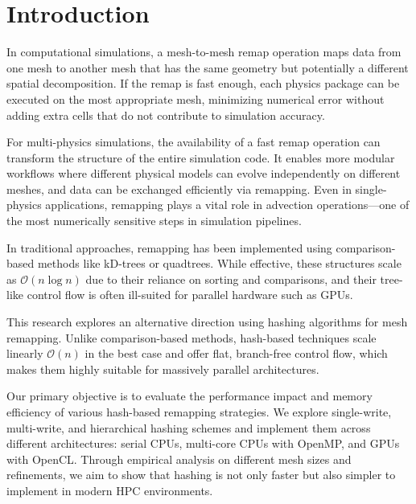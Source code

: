 \section{Introduction}

In computational simulations, a mesh-to-mesh remap operation maps data from one mesh to another mesh that has the same geometry but potentially a different spatial decomposition. If the remap is fast enough, each physics package can be executed on the most appropriate mesh, minimizing numerical error without adding extra cells that do not contribute to simulation accuracy.

For multi-physics simulations, the availability of a fast remap operation can transform the structure of the entire simulation code. It enables more modular workflows where different physical models can evolve independently on different meshes, and data can be exchanged efficiently via remapping. Even in single-physics applications, remapping plays a vital role in advection operations—one of the most numerically sensitive steps in simulation pipelines.

In traditional approaches, remapping has been implemented using comparison-based methods like kD-trees or quadtrees. While effective, these structures scale as $\mathcal{O}(n \log n)$ due to their reliance on sorting and comparisons, and their tree-like control flow is often ill-suited for parallel hardware such as GPUs.

This research explores an alternative direction using hashing algorithms for mesh remapping. Unlike comparison-based methods, hash-based techniques scale linearly $\mathcal{O}(n)$ in the best case and offer flat, branch-free control flow, which makes them highly suitable for massively parallel architectures.

Our primary objective is to evaluate the performance impact and memory efficiency of various hash-based remapping strategies. We explore single-write, multi-write, and hierarchical hashing schemes and implement them across different architectures: serial CPUs, multi-core CPUs with OpenMP, and GPUs with OpenCL. Through empirical analysis on different mesh sizes and refinements, we aim to show that hashing is not only faster but also simpler to implement in modern HPC environments.

